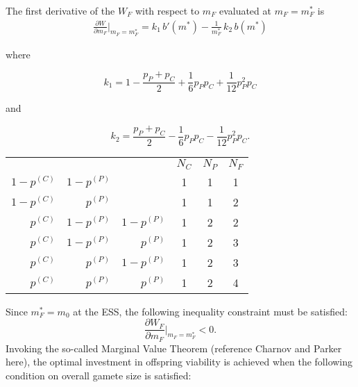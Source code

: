 The first derivative of the $W_F$ with respect to $m_F$ evaluated at $m_F=m_F^*$ is
\begin{align}
    \label{eq:cond_F}
    \frac{\partial W}{\partial m_F}|_{m_F=m_F^*} =
    k_1 \, b'(m^*) - \frac{1}{m_F^*} \, k_2 \, b(m^*)
\end{align}

\noindent where

\begin{equation}
  k_1 = 1 - \frac{p_P + p_C}{2} + \frac{1}{6} p_P p_C + \frac{1}{12} p_P^2 p_C
\end{equation}

\noindent and

\begin{equation}
  k_2 = \frac{p_P + p_C}{2} - \frac{1}{6} p_P p_C - \frac{1}{12} p_P^2 p_C \mbox{.}
\end{equation}

\begin{center}
\begin{tabular}{ |r|r|r|c|c|c| } 
 \hline
             &             && $N_C$ & $N_P$ & $N_F$ \\ 
 $1-p^{(C)}$ & $1-p^{(P)}$ && 1     & 1     & 1 \\ 
 $1-p^{(C)}$ &   $p^{(P)}$ && 1     & 1     & 2 \\ 
   $p^{(C)}$ & $1-p^{(P)}$ & $1-p^{(P)}$ & 1     & 2     & 2 \\ 
   $p^{(C)}$ & $1-p^{(P)}$ & $p^{(P)}$ & 1     & 2     & 3 \\ 
   $p^{(C)}$ & $p^{(P)}$ & $1-p^{(P)}$ & 1     & 2     & 3 \\ 
   $p^{(C)}$ & $p^{(P)}$ & $p^{(P)}$ & 1     & 2     & 4 \\ 
 \hline
\end{tabular}
\label{tab:branching}
\end{center}

\noindent Since $m_F^*=m_0$ at the ESS, the following inequality constraint must be satisfied:
\begin{equation}
  \label{eq:W_F}
    \frac{\partial W_F}{\partial m_F}|_{m_F=m_F^*} < 0 \mbox{.}
\end{equation}
Invoking the so-called Marginal Value Theorem (reference Charnov and Parker here), the optimal investment in offspring viability is achieved when the following condition on overall gamete size is satisfied:

